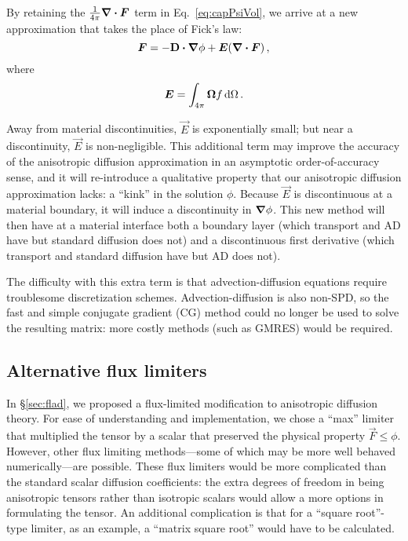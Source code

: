 By retaining the $\frac{1}{4\pi} \bm{\nabla} \bm{\cdot} \bm{F}$ term in
Eq.~\eqref{eq:capPsiVol}, we arrive at a new approximation that takes the place
of Fick's law:
\begin{equation*}
  \bm{F} = - \mathbf{D} \bm{\cdot} \bm{\nabla} \phi + \bm{E} (\bm{\nabla} \bm{\cdot}\bm{F})\,,
\end{equation*}
where
\begin{equation*}
  \bm{E} = \int_{4\pi} \bm{\Omega} f \mathop{}\!\mathrm{d}\Omega\,.
\end{equation*}

Away from material discontinuities, $\vec{E}$ is exponentially small; but
near a discontinuity, $\vec{E}$ is non-negligible. This additional term may
improve the accuracy of the anisotropic diffusion approximation in an
asymptotic order-of-accuracy sense, and it will re-introduce a qualitative
property that our anisotropic
diffusion approximation lacks: a ``kink'' in the solution $\phi$. Because
$\vec{E}$ is discontinuous at a material boundary, it will induce a
discontinuity in $\bm{\nabla} \phi$. This new method will then have at a material
interface both a boundary layer (which transport and AD have but standard
diffusion does not) and a discontinuous first derivative (which transport and
standard diffusion have but AD does not).

The difficulty with this extra term is that advection-diffusion equations
require troublesome discretization schemes. Advection-diffusion is also non-SPD,
so the fast and simple conjugate gradient (CG) method could no longer be used to
solve the resulting matrix: more costly methods (such as GMRES) would be
required.

\subsection{Alternative flux limiters}

In \S\ref{sec:flad}, we proposed a flux-limited modification to anisotropic
diffusion theory. For ease of understanding and implementation, we chose a
``max'' limiter that multiplied the tensor by a scalar that preserved the
physical property $\vec{F} \le \phi$. However, other flux limiting
methods---some of which may be more well behaved numerically---are possible.
These flux limiters would be more complicated than the standard scalar diffusion
coefficients: the extra degrees of freedom in being anisotropic tensors rather
than isotropic scalars would allow a more options in formulating the tensor.
An additional complication is that for a ``square root''-type limiter, as an
example, a ``matrix square root'' would have to be calculated.


